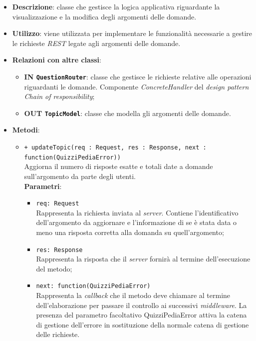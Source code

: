\begin{itemize}
	\item \textbf{Descrizione}:
	classe che gestisce la logica applicativa riguardante la visualizzazione e la modifica degli argomenti delle domande.
	\item \textbf{Utilizzo}:
	viene utilizzata per implementare le funzionalità necessarie a gestire le richieste \textit{REST} legate agli argomenti delle domande.
	\item \textbf{Relazioni con altre classi}:
		\begin{itemize}
			\item \textbf{IN \texttt{QuestionRouter}}:
			classe che gestisce le richieste relative alle operazioni riguardanti le domande. Componente \textit{ConcreteHandler} del \textit{design pattern} \textit{Chain of responsibility};
			\item \textbf{OUT \texttt{TopicModel}}: 
			classe che modella gli argomenti delle domande.
		\end{itemize}
	\item \textbf{Metodi}:
		\begin{itemize}
			\item \texttt{+ updateTopic(req : Request, res : Response, next : function(QuizziPediaError))} \\
			Aggiorna il numero di risposte esatte e totali date a domande sull'argomento da parte degli utenti. \\
			\textbf{Parametri}:
			\begin{itemize}
			\item \texttt{req: Request} \\
			Rappresenta la richiesta inviata al \textit{server}. Contiene l'identificativo dell'argomento da aggiornare e l'informazione di se è stata data o meno una risposta corretta alla domanda su quell'argomento;
			\item \texttt{res: Response} \\
			Rappresenta la risposta che il \textit{server} fornirà al termine dell'esecuzione del metodo;
			\item \texttt{next: function(QuizziPediaError)} \\
			Rappresenta la \textit{callback} che il metodo deve chiamare al termine dell'elaborazione per passare il controllo ai successivi \textit{middleware}. La presenza del parametro facoltativo QuizziPediaError attiva la catena di gestione dell'errore in sostituzione della normale catena di gestione delle richieste.

\end{itemize}
\end{itemize}
\end{itemize}

